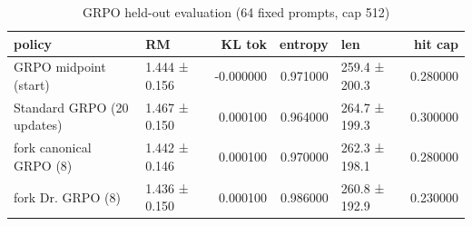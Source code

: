 \begin{table}
\caption{GRPO held-out evaluation (64 fixed prompts, cap 512)}
\label{tab:t3_grpo_heldout}
\begin{tabular}{llrrlr}
\toprule
policy & RM & KL tok & entropy & len & hit cap \\
\midrule
GRPO midpoint (start) & 1.444 ± 0.156 & -0.000000 & 0.971000 & 259.4 ± 200.3 & 0.280000 \\
Standard GRPO (20 updates) & 1.467 ± 0.150 & 0.000100 & 0.964000 & 264.7 ± 199.3 & 0.300000 \\
fork canonical GRPO (8) & 1.442 ± 0.146 & 0.000100 & 0.970000 & 262.3 ± 198.1 & 0.280000 \\
fork Dr. GRPO (8) & 1.436 ± 0.150 & 0.000100 & 0.986000 & 260.8 ± 192.9 & 0.230000 \\
\bottomrule
\end{tabular}
\end{table}
